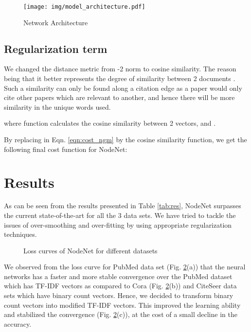 \documentclass{article}
\begin{document}
\begin{figure}[ht]
    \centering
    \texttt{[image: img/model\_architecture.pdf]}
    \caption{Network Architecture}
    \label{fig:network_architecture}
\end{figure}

\subsection{Regularization term}

We changed the distance metric from -2 norm to cosine similarity. The reason being that it better represents the degree of similarity between 2 documents \cite{Singhal01moderninformation}. Such a similarity can only be found along a citation edge as a paper would only cite other papers which are relevant to another, and hence there will be more similarity in the unique words used.


where  function calculates the cosine similarity between 2 vectors,  and .

By replacing  in Eqn. \ref{eqn:cost_ngm} by the cosine similarity function, we get the following final cost function for NodeNet:


\section{Results}

As can be seen from the results presented in Table \ref{tab:res}, NodeNet surpasses the current state-of-the-art for all the 3 data sets. We have tried to tackle the issues of over-smoothing and over-fitting by using appropriate regularization techniques.

\begin{figure}[h]
    \centering
    \hspace{0.01\linewidth}
    \hspace{0.01\linewidth}
    \caption{Loss curves of NodeNet for different datasets}
    \label{fig:loss}
\end{figure}

We observed from the loss curve for PubMed data set (Fig. \ref{fig:loss}(a)) that the neural networks has a faster and more stable convergence over the PubMed dataset which has TF-IDF vectors as compared to Cora (Fig. \ref{fig:loss}(b)) and CiteSeer data sets which have binary count vectors. Hence, we decided to transform binary count vectors into modified TF-IDF vectors. This improved the learning ability and stabilized the convergence (Fig. \ref{fig:loss}(c)), at the cost of a small decline in the accuracy.
\end{document}
